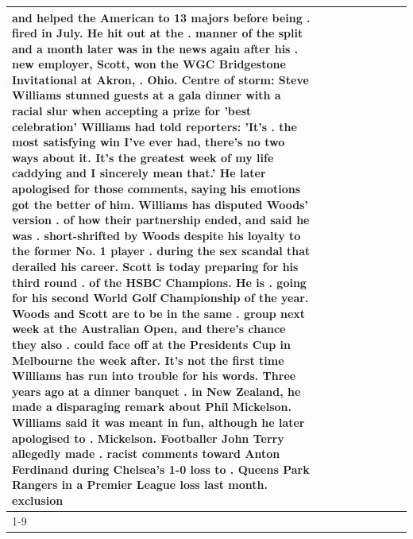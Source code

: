 \begin{table}[H]
\begin{tabular}{lllrlllll}
and helped the American to 13 majors before being . fired in July. He hit out at the . manner of the split and a month later was in the news again after his . new employer, Scott, won the WGC Bridgestone Invitational at Akron, . Ohio. Centre of storm: Steve Williams stunned guests at a gala dinner with a racial slur when accepting a prize for 'best celebration' Williams had told reporters: 'It's . the most satisfying win I've ever had, there's no two ways about it. It's the greatest week of my life caddying and I sincerely mean that.' He later apologised for those comments, saying his emotions got the better of him. Williams has disputed Woods' version . of how their partnership ended, and said he was . short-shrifted by Woods despite his loyalty to the former No. 1 player . during the sex scandal that derailed his career. Scott is today preparing for his third round . of the HSBC Champions. He is . going for his second World Golf Championship of the year. Woods and Scott are to be in the same . group next week at the Australian Open, and there's chance they also . could face off at the Presidents Cup in Melbourne the week after. It's not the first time Williams has run into trouble for his words. Three years ago at a dinner banquet . in New Zealand, he made a disparaging remark about Phil Mickelson. Williams said it was meant in fun, although he later apologised to . Mickelson. Footballer John Terry allegedly made . racist comments toward Anton Ferdinand during Chelsea's 1-0 loss to . Queens Park Rangers in a Premier League loss last month. exclusion \\
\cline{1-9}

\end{tabular}
\end{table}
